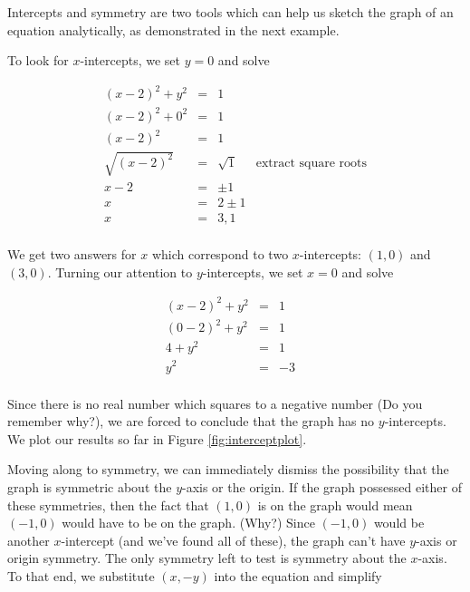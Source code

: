 \medskip

Intercepts and symmetry are two tools which can help us sketch the graph of an equation analytically, as demonstrated in the next example.

{
To look for $x$-intercepts, we set $y=0$ and solve

\[ \begin{array}{rclr}   

(x-2)^2 + y^2 & = & 1 & \\ 
(x-2)^2 + 0^2 & = & 1 & \\ 
(x-2)^2 & = & 1 & \\
\sqrt{(x-2)^2} & = & \sqrt{1} & \mbox{extract square roots}\\
x - 2 & = & \pm 1 & \\
x  & = & 2 \pm 1 & \\
x  & = & 3, 1 & \\

\end{array} \]

We get two answers for $x$ which correspond to two $x$-intercepts:  $(1,0)$ and $(3,0)$.    Turning our attention to $y$-intercepts, we set $x=0$ and solve

\[ \begin{array}{rclr}   

(x-2)^2 + y^2 & = & 1 & \\ 
(0-2)^2 + y^2 & = & 1 & \\ 
4 + y^2 & = & 1 & \\
y^2 & = & -3 & \\

\end{array} \]

Since there is no real number which squares to a negative number (Do you remember why?), we are forced to conclude that the graph has no $y$-intercepts. We plot our results so far in Figure \ref{fig:interceptplot}.

\medskip


Moving along to symmetry, we can immediately dismiss the possibility that the graph is symmetric about the $y$-axis or the origin.  If the graph possessed either of these symmetries, then the fact that $(1,0)$ is on the graph would mean $(-1,0)$ would have to be on the graph. (Why?)  Since $(-1,0)$ would be another $x$-intercept (and we've found all of these), the graph can't have $y$-axis or origin symmetry.  The only symmetry left to test is symmetry about the $x$-axis.   To that end, we substitute $(x,-y)$ into the equation and simplify

}
